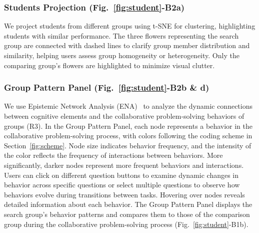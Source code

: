  
\subsubsection{Students Projection (Fig.~\ref{fig:student}-B2a)}

We project students from different groups using t-SNE for clustering, highlighting students with similar performance. 
The three flowers representing the search group are connected with dashed lines to clarify group member distribution and similarity, helping users assess group homogeneity or heterogeneity. 
Only the comparing group's flowers are highlighted to minimize visual clutter. 

\subsubsection{Group Pattern Panel (Fig.~\ref{fig:student}-B2b \& d)}
We use Epistemic Network Analysis (ENA)~\cite{zhao2023analysing} to analyze the dynamic connections between cognitive elements and the collaborative problem-solving behaviors of groups (R3). 
In the Group Pattern Panel, each node represents a behavior in the collaborative problem-solving process, with colors following the coding scheme in Section~\ref{fig:scheme}. Node size indicates behavior frequency, and the intensity of the color reflects the frequency of interactions between behaviors. More significantly, darker nodes represent more frequent behaviors and interactions. 
Users can click on different question buttons to examine dynamic changes in behavior across specific questions or select multiple questions to observe how behaviors evolve during transitions between tasks. Hovering over nodes reveals detailed information about each behavior.
The Group Pattern Panel displays the search group's behavior patterns and compares them to those of the comparison group during the collaborative problem-solving process (Fig.~\ref{fig:student}-B1b).


